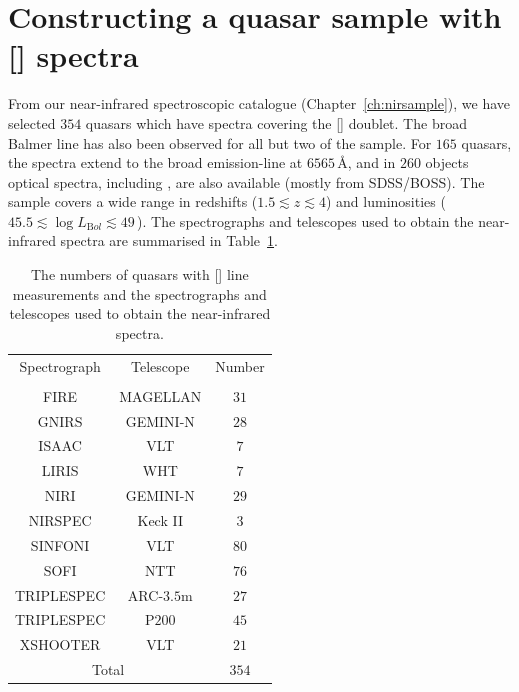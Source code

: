 \section{Constructing a quasar sample with [] spectra}

From our near-infrared spectroscopic catalogue (Chapter~\ref{ch:nirsample}), we have selected $354$ quasars which have spectra covering the [] doublet. 
The broad Balmer \hb line has also been observed for all but two of the sample. 
For $165$ quasars, the spectra extend to the broad \ha emission-line at $6565$\,\AA, and in $260$ objects optical spectra, including , are also available (mostly from SDSS/BOSS). 
The sample covers a wide range in redshifts ($1.5 \lesssim z \lesssim 4$) and luminosities ($45.5 \lesssim \log L_{\mathrm Bol} \lesssim 49$\,\ergs). 
The spectrographs and telescopes used to obtain the near-infrared spectra are summarised in Table~\ref{tab:specnums_ch4}.

\begin{table}
  \centering
  \footnotesize 
  \caption{The numbers of quasars with [] line measurements and the spectrographs and telescopes used to obtain the near-infrared spectra.}
  \label{tab:specnums_ch4}
    \begin{tabular}{ccc} 
    \hline
    Spectrograph & Telescope & Number \\
                 &           & \\
    \hline
    FIRE         & MAGELLAN  & $31$ \\
    GNIRS        & GEMINI-N  & $28$ \\
    ISAAC        & VLT       & $7$ \\
    LIRIS        & WHT       & $7$ \\
    NIRI         & GEMINI-N  & $29$ \\
    NIRSPEC      & Keck II   & $3$ \\
    SINFONI      & VLT       & $80$ \\
    SOFI         & NTT       & $76$ \\
    TRIPLESPEC   & ARC-$3.5$m  & $27$ \\
    TRIPLESPEC   & P$200$      & $45$ \\
    XSHOOTER     & VLT       & $21$ \\
    \hline
    \multicolumn{2}{c}{Total} & $354$ \\
    \hline
    \end{tabular}
\end{table} 

